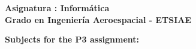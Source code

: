 \documentclass[12pt,spanish]{article}
\begin{document}
\begin{center}
	{\bf \Large Asignatura : 
	Informática}                                               
	\\ \vspace{1cm}
	{\bf \Large Grado en Ingeniería Aeroespacial - 
	ETSIAE}                                            \\
\end{center}

\vspace{1cm}

\noindent
{\bf \Large Subjects for the P3 assignment: 
}                                                                               
     
\vspace{0.5cm}
\end{document}
